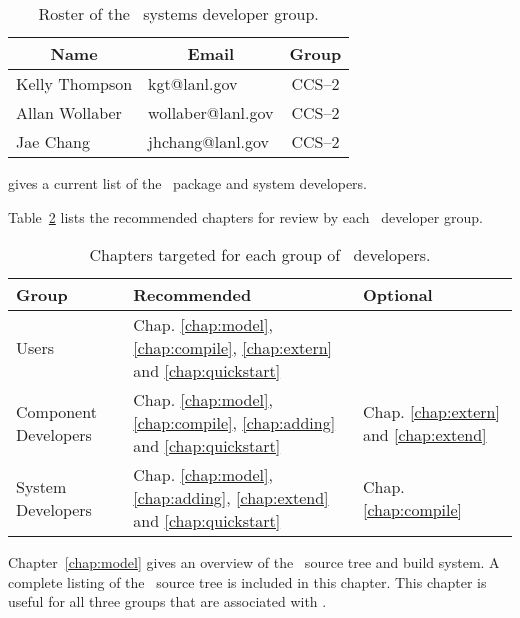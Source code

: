 \begin{table}
  \begin{center}
    \caption{Roster of the \draco\ systems developer group.}
    \label{tab:draco_system}
    \begin{tabular}{llc}\hline\hline
      \multicolumn{1}{c}{Name} & \multicolumn{1}{c}{Email} &
      Group \\ \hline
      Kelly Thompson & kgt@lanl.gov & CCS--2 \\
      Allan Wollaber & wollaber@lanl.gov & CCS--2 \\
      Jae Chang & jhchang@lanl.gov & CCS--2 \\
\hline\hline
    \end{tabular}
  \end{center}
\end{table}
gives a current list of the \draco\ package and system developers.

Table~\ref{tab:layout} lists the recommended chapters for review by each \draco\ developer group.
\begin{table}
  \begin{center}
    \caption{Chapters targeted for each group of \draco\ developers.}
    \label{tab:layout}
    \begin{tabular}{lll}\hline\hline
          Group                             & Recommended  & Optional \\ \hline
	Users                             & Chap. \ref{chap:model}, \ref{chap:compile}, \ref{chap:extern} and \ref{chap:quickstart} &    \\
	Component Developers & Chap. \ref{chap:model}, \ref{chap:compile}, \ref{chap:adding} and \ref{chap:quickstart} & Chap. \ref{chap:extern} and \ref{chap:extend}  \\
	System Developers        & Chap. \ref{chap:model}, \ref{chap:adding},  \ref{chap:extend} and \ref{chap:quickstart} & Chap. \ref{chap:compile} \\  \hline \hline

    \end{tabular}
  \end{center}
\end{table}
Chapter~\ref{chap:model} gives an overview of the \draco\ source tree
and build system. A complete listing of the \draco\ source tree is
included in this chapter. This chapter is useful for all three groups
that are associated with \draco.

